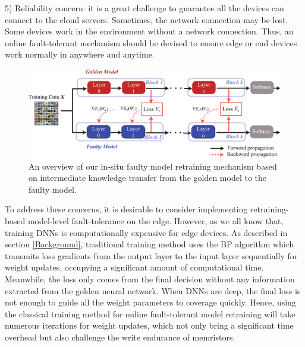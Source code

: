 5) Reliability concern:  it is a great challenge to guarantee all the devices can connect to the cloud servers. Sometimes, the network connection may be lost. Some devices work in the environment without a network connection. Thus, an online fault-tolerant mechanism should be devised to ensure edge or end devices work normally in anywhere and anytime.
                                                                                                                                                                                                                                                                                                                                    
\begin{figure} 
    \centering
    \includegraphics[width=0.75\linewidth]{images/OL-fig8}
    \caption{An overview of our in-situ faulty model retraining mechanism based on intermediate knowledge transfer from the golden model to the faulty model.}
    \label{fig:insitutraining} 
    \vspace{-15pt}
\end{figure}

To address these concerns, it is desirable to consider implementing retraining-based model-level fault-tolerance on the edge. However, as we all know that, training DNNs is computationally expensive for edge devices. As described in section \ref{Background}, traditional training method uses the BP algorithm which transmits loss gradients from the output layer to the input layer sequentially for weight updates, occupying a significant amount of computational time. Meanwhile, the loss only comes from the final decision without any information extracted from the golden neural network. When DNNs are deep, the final loss is not enough to guide all the weight parameters to coverage quickly. Hence, using the classical training method for online fault-tolerant model retraining will take numerous iterations for weight updates, which not only bring a significant time overhead but also challenge the write endurance of memristors. 
                                                                                                                                                                                                                                                                                                                    
